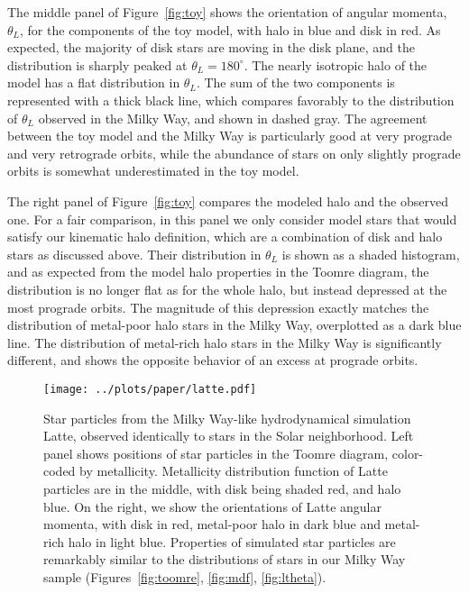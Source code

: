 \documentclass[apj, twocolappendix, numberedappendix, appendixfloats]{emulateapj}
\begin{document}
The middle panel of Figure~\ref{fig:toy} shows the orientation of angular momenta, $\theta_L$, for the components of the toy model, with halo in blue and disk in red.
As expected, the majority of disk stars are moving in the disk plane, and the distribution is sharply peaked at $\theta_L=180^\circ$.
The nearly isotropic halo of the \citet{bensby2003} model has a flat distribution in $\theta_L$.
The sum of the two components is represented with a thick black line, which compares favorably to the distribution of $\theta_L$ observed in the Milky Way, and shown in dashed gray.
The agreement between the toy model and the Milky Way is particularly good at very prograde and very retrograde orbits, while the abundance of stars on only slightly prograde orbits is somewhat underestimated in the toy model.

The right panel of Figure~\ref{fig:toy} compares the modeled halo and the observed one.
For a fair comparison, in this panel we only consider model stars that would satisfy our kinematic halo definition, which are a combination of disk and halo stars as discussed above.
Their distribution in $\theta_L$ is shown as a shaded histogram, and as expected from the model halo properties in the Toomre diagram, the distribution is no longer flat as for the whole halo, but instead depressed at the most prograde orbits.
The magnitude of this depression exactly matches the distribution of metal-poor halo stars in the Milky Way, overplotted as a dark blue line.
The distribution of metal-rich halo stars in the Milky Way is significantly different, and shows the opposite behavior of an excess at prograde orbits.

\begin{figure*}
\begin{center}
\texttt{[image: ../plots/paper/latte.pdf]}
\caption{Star particles from the Milky Way-like hydrodynamical simulation Latte, observed identically to stars in the Solar neighborhood.
Left panel shows positions of star particles in the Toomre diagram, color-coded by metallicity.
Metallicity distribution function of Latte particles are in the middle, with disk being shaded red, and halo blue.
On the right, we show the orientations of Latte angular momenta, with disk in red, metal-poor halo in dark blue and metal-rich halo in light blue.
Properties of simulated star particles are remarkably similar to the distributions of stars in our Milky Way sample (Figures~\ref{fig:toomre}, \ref{fig:mdf}, \ref{fig:ltheta}).}
\label{fig:latte}
\end{center}
\end{figure*}
\end{document}
